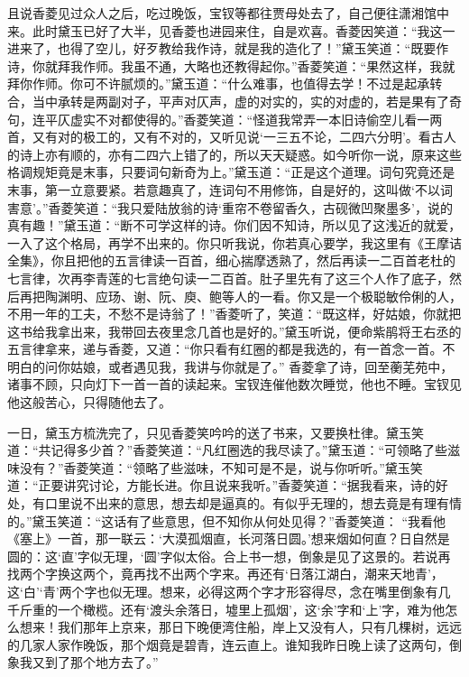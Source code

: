 \begin{parag}
    且说香菱见过众人之后，吃过晚饭，宝钗等都往贾母处去了，自己便往潇湘馆中来。此时黛玉已好了大半，见香菱也进园来住，自是欢喜。香菱因笑道：“我这一进来了，也得了空儿，好歹教给我作诗，就是我的造化了！”黛玉笑道：“既要作诗，你就拜我作师。我虽不通，大略也还教得起你。”香菱笑道：“果然这样，我就拜你作师。你可不许腻烦的。”黛玉道：“什么难事，也值得去学！不过是起承转合，当中承转是两副对子，平声对仄声，虚的对实的，实的对虚的，若是果有了奇句，连平仄虚实不对都使得的。”香菱笑道：“怪道我常弄一本旧诗偷空儿看一两首，又有对的极工的，又有不对的，又听见说‘一三五不论，二四六分明’。看古人的诗上亦有顺的，亦有二四六上错了的，所以天天疑惑。如今听你一说，原来这些格调规矩竟是末事，只要词句新奇为上。”黛玉道：“正是这个道理。词句究竟还是末事，第一立意要紧。若意趣真了，连词句不用修饰，自是好的，这叫做‘不以词害意’。”香菱笑道：“我只爱陆放翁的诗‘重帘不卷留香久，古砚微凹聚墨多’，说的真有趣！”黛玉道：“断不可学这样的诗。你们因不知诗，所以见了这浅近的就爱，一入了这个格局，再学不出来的。你只听我说，你若真心要学，我这里有《王摩诘全集》，你且把他的五言律读一百首，细心揣摩透熟了，然后再读一二百首老杜的七言律，次再李青莲的七言绝句读一二百首。肚子里先有了这三个人作了底子，然后再把陶渊明、应玚、谢、阮、庾、鲍等人的一看。你又是一个极聪敏伶俐的人，不用一年的工夫，不愁不是诗翁了！”香菱听了，笑道：“既这样，好姑娘，你就把这书给我拿出来，我带回去夜里念几首也是好的。”黛玉听说，便命紫鹃将王右丞的五言律拿来，递与香菱，又道：“你只看有红圈的都是我选的，有一首念一首。不明白的问你姑娘，或者遇见我，我讲与你就是了。” 香菱拿了诗，回至蘅芜苑中，诸事不顾，只向灯下一首一首的读起来。宝钗连催他数次睡觉，他也不睡。宝钗见他这般苦心，只得随他去了。
\end{parag}


\begin{parag}
    一日，黛玉方梳洗完了，只见香菱笑吟吟的送了书来，又要换杜律。黛玉笑道：“共记得多少首？”香菱笑道：“凡红圈选的我尽读了。”黛玉道：“可领略了些滋味没有？”香菱笑道：“领略了些滋味，不知可是不是，说与你听听。”黛玉笑道：“正要讲究讨论，方能长进。你且说来我听。”香菱笑道：“据我看来，诗的好处，有口里说不出来的意思，想去却是逼真的。有似乎无理的，想去竟是有理有情的。”黛玉笑道：“这话有了些意思，但不知你从何处见得？”香菱笑道： “我看他《塞上》一首，那一联云：‘大漠孤烟直，长河落日圆。’想来烟如何直？日自然是圆的：这‘直’字似无理，‘圆’字似太俗。合上书一想，倒象是见了这景的。若说再找两个字换这两个，竟再找不出两个字来。再还有‘日落江湖白，潮来天地青’，这‘白’‘青’两个字也似无理。想来，必得这两个字才形容得尽，念在嘴里倒象有几千斤重的一个橄榄。还有‘渡头余落日，墟里上孤烟’，这‘余’字和‘上’字，难为他怎么想来！我们那年上京来，那日下晚便湾住船，岸上又没有人，只有几棵树，远远的几家人家作晚饭，那个烟竟是碧青，连云直上。谁知我昨日晚上读了这两句，倒象我又到了那个地方去了。”
\end{parag}


